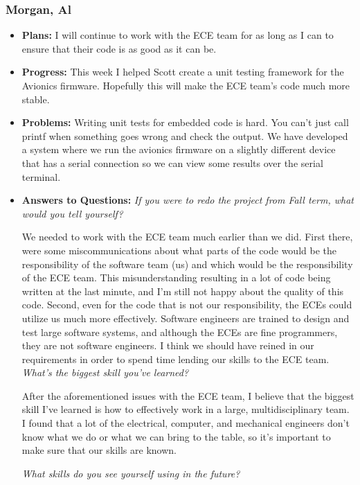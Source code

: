 \documentclass[10pt,draftclsnofoot,onecolumn]{IEEEtran}
\begin{document}
\subsubsection{Morgan, Al}
\begin{itemize}
	\item \textbf{Plans: }
	I will continue to work with the ECE team for as long as I can to ensure that their code is as good as it can be.
	\item \textbf{Progress: }
	This week I helped Scott create a unit testing framework for the Avionics firmware. Hopefully this will make the ECE team's code much more stable.
	\item \textbf{Problems: }
	Writing unit tests for embedded code is hard. You can't just call printf when something goes wrong and check the output. We have developed a system where we run the avionics firmware on a slightly different device that has a serial connection so we can view some results over the serial terminal.
	\item\textbf{Answers to Questions: }
	\textit{If you were to redo the project from Fall term, what would you tell yourself?}

	We needed to work with the ECE team much earlier than we did. First there, were some miscommunications about what parts of the code would be the responsibility of the software team (us) and which would be the responsibility of the ECE team. This misunderstanding resulting in a lot of code being written at the last minute, and I'm still not happy about the quality of this code. Second, even for the code that is not our responsibility, the ECEs could utilize us much more effectively. Software engineers are trained to design and test large software systems, and although the ECEs are fine programmers, they are not software engineers. I think we should have reined in our requirements in order to spend time lending our skills to the ECE team.\\

	\textit{What's the biggest skill you've learned?}

	After the aforementioned issues with the ECE team, I believe that the biggest skill I've learned is how to effectively work in a large, multidisciplinary team. I found that a lot of the electrical, computer, and mechanical engineers don't know what we do or what we can bring to the table, so it's important to make sure that our skills are known.

	\textit{What skills do you see yourself using in the future?}


\end{itemize}
\end{document}

